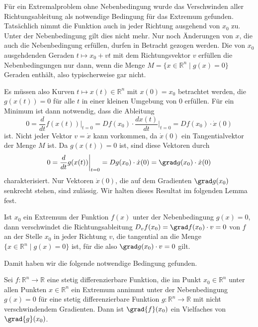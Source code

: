 Für ein Extremalproblem ohne Nebenbedingung wurde das Verschwinden
aller Richtungsableitung als notwendige Bedingung für das
Extremum gefunden.
Tatsächlich nimmt die Funktion auch in jeder Richtung ausgehend
von $x_0$ zu.
Unter der Nebenbedingung gilt dies nicht mehr.
Nur noch Änderungen von $x$, die auch die Nebenbedingung
erfüllen, durfen in Betracht gezogen werden.
Die von $x_0$ ausgehdenden Geraden $t\mapsto x_0+vt$ mit dem
Richtungsvektor $v$ erfüllen die Nebenbedingungen nur dann, wenn
die Menge $M=\{x\in\mathbb{R}^n \mid g(x)=0\}$ Geraden enthält, also
typischerweise gar nicht.

Es müssen also Kurven $t\mapsto x(t)\in\mathbb{R}^n$ mit $x(0)=x_0$
betrachtet werden, die $g(x(t))=0$ für alle $t$ in einer kleinen Umgebung
von $0$ erfüllen.
Für ein Minimum ist dann notwendig, dass die Ableitung
\begin{equation}
0
=
\frac{d}{dt} f(x(t))\bigg|_{t=0}
=
Df(x_0)\cdot \frac{dx(t)}{dt}\bigg|_{t=0}
=
Df(x_0)\cdot \dot{x}(0)
\label{buch:fuvar:nebenbedingungen:eqn:gradf}
\end{equation}
ist.
Nicht jeder Vektor $v=\dot{x}$ kann vorkommen, da $\dot{x}(0)$ ein
Tangentialvektor der Menge $M$ ist.
Da $g(x(t))=0$ ist, sind diese Vektoren durch
\begin{equation}
0
=
\frac{d}{dt}g(x(t))\bigg|_{t=0}
=
Dg(x_0)\cdot \dot{x}(0)
=
\grad g(x_0)\cdot \dot{x}(0)
\label{buch:fuvar:nebenbedingungen:eqn:gradg}
\end{equation}
charakterisiert.
Nur Vektoren $\dot{x}(0)$, die auf dem Gradienten $\grad g(x_0)$ 
senkrecht stehen, sind zulässig.
Wir halten dieses Resultat im folgenden Lemma fest.

\begin{lemma}
\label{buch:fuvar:nebenbedingungen:lemma:nebenbedingungen}
Ist $x_0$ ein Extremum der Funktion $f(x)$ unter der Nebenbedingung
$g(x)=0$, dann verschwindet die Richtungsableitung
\(
D_vf(x_0) = \grad f(x_0)\cdot v = 0
\)
von $f$ an der Stelle $x_0$ in jeder Richtung $v$, die tangential
an die Menge $\{x\in\mathbb{R}^n \mid g(x)=0\}$ ist, für die also
$\grad g(x_0)\cdot v=0$ gilt.
\end{lemma}

Damit haben wir die folgende notwendige Bedingung gefunden.

\begin{satz}
Sei $f\colon\mathbb{R}^n\to\mathbb{R}$ eine stetig differenzierbare
Funktion, die im Punkt $x_0\in\mathbb{R}^n$ unter allen Punkten
$x\in\mathbb{R}^n$ ein Extremum annimmt unter der Nebenbedingung
$g(x)=0$ für eine stetig differenzierbare Funktion
$g\colon\mathbb{R}^n\to\mathbb{R}$ mit nicht verschwindendem Gradienten.
Dann ist $\grad{f}(x_0)$ ein Vielfaches von $\grad{g}(x_0)$.
\end{satz}

